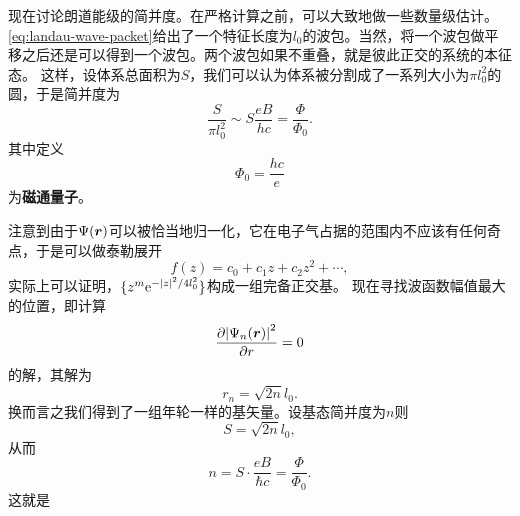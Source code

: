 \documentclass[UTF8, a4paper]{ctexart}
\newcommand*{\ee}{\mathrm{e}}
\begin{document}
现在讨论朗道能级的简并度。在严格计算之前，可以大致地做一些数量级估计。
\eqref{eq:landau-wave-packet}给出了一个特征长度为$l_0$的波包。当然，将一个波包做平移之后还是可以得到一个波包。两个波包如果不重叠，就是彼此正交的系统的本征态。
这样，设体系总面积为$S$，我们可以认为体系被分割成了一系列大小为$\pi l_0^2$的圆，于是简并度为
\[
    \frac{S}{\pi l_0^2} \sim S \frac{eB}{h c} = \frac{\Phi}{\Phi_0}.
\]
其中定义
\begin{equation}
    \Phi_0 = \frac{h c}{e}
\end{equation}
为\textbf{磁通量子}。

注意到由于$\Psi(\vb*{r})$可以被恰当地归一化，它在电子气占据的范围内不应该有任何奇点，于是可以做泰勒展开
\[
    f(z) = c_0 + c_1 z + c_2 z^2 + \cdots,
\]
实际上可以证明，$\{z^m \ee^{- \abs{z}^2 / 4 l_0^2}\}$构成一组完备正交基。
现在寻找波函数幅值最大的位置，即计算
\[
    \pdv{\abs{\Psi_n(\vb*{r})}^2}{r} = 0
\]
的解，其解为
\[
    r_n = \sqrt{2n} l_0.
\]
换而言之我们得到了一组年轮一样的基矢量。设基态简并度为$n$则
\[
    S = \sqrt{2n} l_0,
\]
从而
\[
    n = S \cdot \frac{eB}{\hbar c} = \frac{\Phi}{\Phi_0}.
\]
这就是
\end{document}
